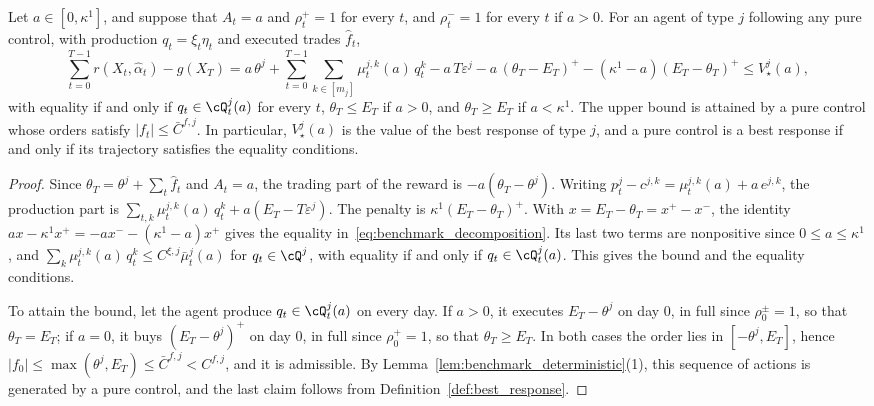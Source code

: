     \begin{lemma}
        \label{lem:benchmark_br}
        Let $a \in [0, \kappa^1]$, and suppose that $A_t = a$ and $\rho^+_t = 1$ for every $t$, and $\rho^-_t = 1$ for every $t$ if $a > 0$. For an agent of type $j$ following any pure control, with production $q_t = \xi_t \eta_t$ and executed trades $\hat f_t$,
        \begin{equation}
            \label{eq:benchmark_decomposition}
            \sum_{t=0}^{T-1} r(X_t, \hat\alpha_t) - g(X_T) = a\, \theta^j + \sum_{t=0}^{T-1} \sum_{k \in [m_j]} \mu^{j,k}_t(a)\, q^k_t - a\, T \varepsilon^j - a\, (\theta_T - E_T)^+ - (\kappa^1 - a) (E_T - \theta_T)^+ \le V^j_\star(a),
        \end{equation}
        with equality if and only if $q_t \in \cQ^j_t(a)$ for every $t$, $\theta_T \le E_T$ if $a > 0$, and $\theta_T \ge E_T$ if $a < \kappa^1$. The upper bound is attained by a pure control whose orders satisfy $|f_t| \le \bar C^{f,j}$. In particular, $V^j_\star(a)$ is the value of the best response of type $j$, and a pure control is a best response if and only if its trajectory satisfies the equality conditions.
    \end{lemma}

    \begin{proof}
        Since $\theta_T = \theta^j + \sum_t \hat f_t$ and $A_t = a$, the trading part of the reward is $-a(\theta_T - \theta^j)$. Writing $p^j_t - c^{j,k} = \mu^{j,k}_t(a) + a\, e^{j,k}$, the production part is $\sum_{t,k} \mu^{j,k}_t(a)\, q^k_t + a(E_T - T\varepsilon^j)$. The penalty is $\kappa^1 (E_T - \theta_T)^+$. With $x = E_T - \theta_T = x^+ - x^-$, the identity $a x - \kappa^1 x^+ = -a x^- - (\kappa^1 - a) x^+$ gives the equality in~\eqref{eq:benchmark_decomposition}. Its last two terms are nonpositive since $0 \le a \le \kappa^1$, and $\sum_k \mu^{j,k}_t(a)\, q^k_t \le C^{\xi,j} \bar\mu^j_t(a)$ for $q_t \in \cQ^j$, with equality if and only if $q_t \in \cQ^j_t(a)$. This gives the bound and the equality conditions.

        To attain the bound, let the agent produce $q_t \in \cQ^j_t(a)$ on every day. If $a > 0$, it executes $E_T - \theta^j$ on day $0$, in full since $\rho^\pm_0 = 1$, so that $\theta_T = E_T$; if $a = 0$, it buys $(E_T - \theta^j)^+$ on day $0$, in full since $\rho^+_0 = 1$, so that $\theta_T \ge E_T$. In both cases the order lies in $[-\theta^j, E_T]$, hence $|f_0| \le \max(\theta^j, E_T) \le \bar C^{f,j} < C^{f,j}$, and it is admissible. By Lemma~\ref{lem:benchmark_deterministic}(1), this sequence of actions is generated by a pure control, and the last claim follows from Definition~\ref{def:best_response}.
    \end{proof}

